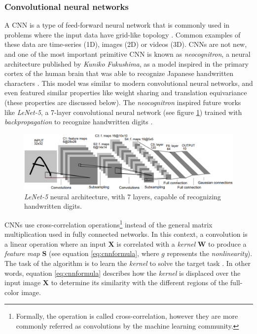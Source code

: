 \subsubsection{Convolutional neural networks}
A CNN is a type of feed-forward neural network that is commonly used in problems where the input data have grid-like topology \autocite{Goodfellow2016}. Common examples of these data are time-series (1D), images (2D) or videos (3D). CNNs are not new, and one of the most important primitive CNN is known as \textit{neocognitron}, a neural architecture published by \textit{Kuniko Fukushima}, as a model inspired in the primary cortex of the human brain that was able to recognize Japanese handwritten characters \autocite{fukushima1980}. This model was similar to modern convolutional neural networks, and even featured similar properties like weight sharing and translation equivariance (these properties are discussed below). The \textit{neocognitron} inspired future works like \textit{LeNet-5}, a 7-layer convolutional neural network (see figure \ref{fig:lenet5}) trained with \textit{backpropagation} to recognize handwritten digits \autocite{lecun1998}.

\begin{figure}
	\centering
	\includegraphics[width=0.85\linewidth]{background/images/lenet5}
	\caption[\textit{LeNet-5} architecture]{\textit{LeNet-5} neural architecture, with 7 layers, capable of recognizing handwritten digits.}
	\label{fig:lenet5}
\end{figure}

CNNs use cross-correlation operations\footnote{Formally, the operation is called cross-correlation, however they are more commonly referred as convolutions by the machine learning community.} instead of the general matrix multiplication used in fully connected networks. In this context, a convolution is a linear operation where an input $\mathbf{X}$ is correlated with a \textit{kernel} $\mathbf{W}$ to produce a \textit{feature map} $\mathbf{S}$ (see equation \ref{eq:cnnformula}, where $g$ represents the \textit{nonlinearity}). The task of the algorithm is to learn the \textit{kernel} to solve the target task \autocite{haykin1998}. In other words, equation \ref{eq:cnnformula} describes how the \textit{kernel} is displaced over the input image $\mathbf{X}$ to determine its similarity with the different regions of the full-color image.

